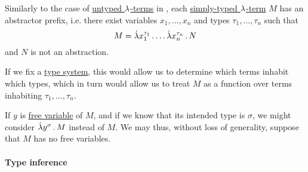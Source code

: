 \begin{remark}\label{rem:simply_typed_lambda_term_dependency}
  Similarly to the case of \hyperref[def:lambda_term]{untyped \( {\mathrm \lambda} \)-terms} in , each \hyperref[def:typed_lambda_term]{simply-typed \( {\mathrm \lambda} \)-term} \( M \) has an abstractor prefix, i.e. there exist variables \( x_1, \ldots, x_n \) and types \( \tau_1, \ldots, \tau_n \) such that
  \begin{equation*}
    M = \qabs {x_1^{\tau_1}}\ldots \qabs {x_n^{\tau_n}} N
  \end{equation*}
  and \( N \) is not an abstraction.

  If we fix a \hyperref[def:abstract_type_system]{type system}, this would allow us to determine which terms inhabit which types, which in turn would allow us to treat \( M \) as a function over terms inhabiting \( \tau_1, \ldots, \tau_n \).

  If \( y \) is \hyperref[def:lambda_variable_freeness]{free variable} of \( M \), and if we know that its intended type is \( \sigma \), we might consider \( \qabs {y^\sigma} M \) instead of \( M \). We may thus, without loss of generality, suppose that \( M \) has no free variables.
\end{remark}

\paragraph{Type inference}

